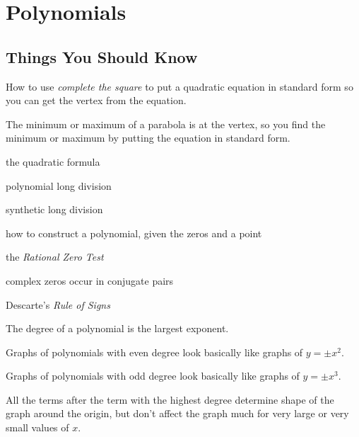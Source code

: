 \documentclass[fleqn,addpoints]{exam}
\begin{document}
\section{Polynomials}

\subsection{Things You Should Know}
\begin{itemize*}
\item How to use {\em complete the square} to put a quadratic equation in standard form so you can get the vertex from the equation.
\item The minimum or maximum of a parabola is at the vertex, so you find the minimum or maximum by putting the equation
  in standard form.
\item the quadratic formula
\item polynomial long division
\item synthetic long division
\item how to construct a polynomial, given the zeros and a point
\item the {\em Rational Zero Test}
\item complex zeros occur in conjugate pairs
\item Descarte's {\em Rule of Signs}
\item The degree of a polynomial is the largest exponent.
\item Graphs of polynomials with even degree look basically like graphs of $y= \pm x^2$.
\item Graphs of polynomials with odd degree look basically like graphs of $y= \pm x^3$.
\item All the terms after the term with the highest degree determine shape of the graph around the origin, but don't
  affect the graph much for very large or very small values of $x$.
\end{itemize*}
\end{document}
